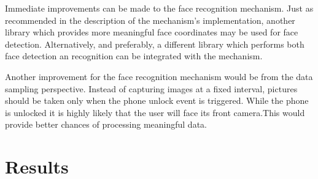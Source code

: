 Immediate improvements can be made to the face recognition mechanism. Just as recommended in the description of the mechanism's implementation, another library which provides more meaningful face coordinates may be used for face detection. Alternatively, and preferably, a different library which performs both face detection an recognition can be integrated with the mechanism.

Another improvement for the face recognition mechanism would be from the data sampling perspective. Instead of capturing images at a fixed interval, pictures should be taken only when the phone unlock event is triggered. While the phone is unlocked it is highly likely that the user will face its front camera.This would provide better chances of processing meaningful data.

\section{Results}

